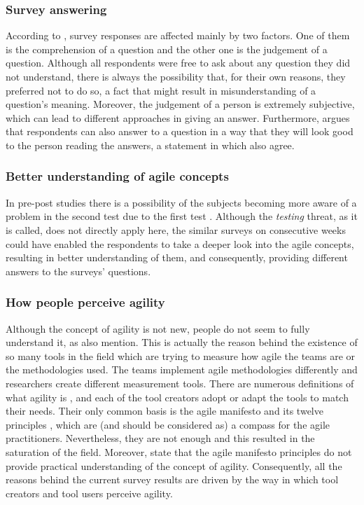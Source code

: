 \subsubsection{Survey answering}
According to \citet{Wagner_Zeglovits}, survey responses are affected mainly by two factors. One of them is the comprehension of a question and the other one is the judgement of a question. Although all respondents were free to ask about any question they did not understand, there is always the possibility that, for their own reasons, they preferred not to do so, a fact that might result in misunderstanding of a question's meaning. Moreover, the judgement of a person is extremely subjective, which can lead to different approaches in giving an answer. Furthermore, \citet{Floyd_Fowler} argues that respondents can also answer to a question in a way that they will look good to the person reading the answers, a statement in which \citet{feldt_angelis_torkar_samuelsson} also agree.

\subsubsection{Better understanding of agile concepts}
In pre-post studies there is a possibility of the subjects becoming more aware of a problem in the second test due to the first test \cite{Campbell_Stanley}. Although the \textit{testing} threat, as it is called, does not directly apply here, the similar surveys on consecutive weeks could have enabled the respondents to take a deeper look into the agile concepts, resulting in better understanding of them, and consequently, providing different answers to the surveys' questions. 

\subsubsection{How people perceive agility}
Although the concept of agility is not new, people do not seem to fully understand it, as \citet{Wang_Conboy} also mention. This is actually the reason behind the existence of so many tools in the field which are trying to measure how agile the teams are or the methodologies used. The teams implement agile methodologies differently and researchers create different measurement tools. There are numerous definitions of what agility is \cite{Kidd, Kara, Ramesh, agile_manufacturing}, and each of the tool creators adopt or adapt the tools to match their needs. Their only common basis is the agile manifesto \cite{beck2001agile} and its twelve principles \cite{agile_principles}, which are (and should be considered as) a compass for the agile practitioners. Nevertheless, they are not enough and this resulted in the saturation of the field. Moreover, \citet{conboy_fitzgerald} state that the agile manifesto principles do not provide practical understanding of the concept of agility. Consequently, all the reasons behind the current survey results are driven by the way in which tool creators and tool users perceive agility.

